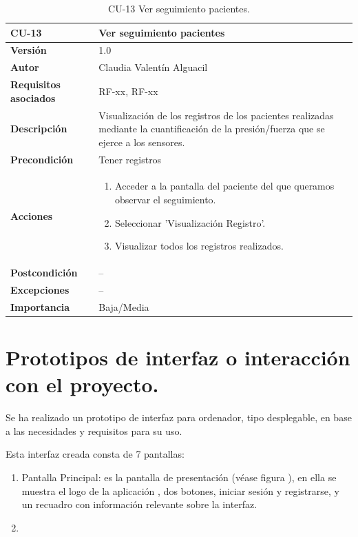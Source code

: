 \begin{table}[p]
	\centering
	\begin{tabularx}{\linewidth}{ p{} p{} }
		\toprule
		\textbf{CU-13}    & \textbf{Ver seguimiento pacientes}\\
		\toprule
		\textbf{Versión}              & 1.0    \\
		\textbf{Autor}                & Claudia Valentín Alguacil \\
		\textbf{Requisitos asociados} & RF-xx, RF-xx \\
		\textbf{Descripción}          & Visualización de los registros de los pacientes realizadas mediante la cuantificación de la presión/fuerza que se ejerce a los sensores.\\
		\textbf{Precondición}         & Tener registros \\
		\textbf{Acciones}             &
		\begin{enumerate}
			\def\labelenumi{\arabic{enumi}.}
			\tightlist
			\item Acceder a la pantalla del paciente del que queramos observar el seguimiento.
			\item Seleccionar 'Visualización Registro'.
                \item Visualizar todos los registros realizados.
		\end{enumerate}\\
		\textbf{Postcondición}        &  -- \\
		\textbf{Excepciones}          & -- \\
		\textbf{Importancia}          & Baja/Media \\
		\bottomrule
	\end{tabularx}
	\caption{CU-13 Ver seguimiento pacientes.}
\end{table}
\section{Prototipos de interfaz o interacción con el proyecto.}

Se ha realizado un prototipo de interfaz para ordenador, tipo desplegable, en base a las necesidades y requisitos para su uso. 

Esta interfaz creada consta de 7 pantallas:
\begin{enumerate}
    \item Pantalla Principal: es la pantalla de presentación (véase figura ), en ella se muestra el logo de la aplicación , dos botones, iniciar sesión y registrarse, y un recuadro con información relevante sobre la interfaz.
    \item 
\end{enumerate}